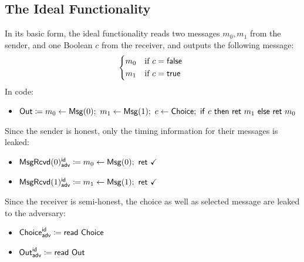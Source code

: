 \subsection{The Ideal Functionality}
In its basic form, the ideal functionality reads two messages $m_0,m_1$ from the sender, and one Boolean $c$ from the receiver, and outputs the following message:
\[\begin{cases*}
m_0 & \text{if $c = \false$} \\
m_1 & \text{if $c = \true$}
\end{cases*}\]
In code:
\begin{itemize}
\item $\Out \coloneqq m_0 \leftarrow \Msg(0); \ m_1 \leftarrow \Msg(1); \ c \leftarrow \Choice; \ \ifte{c}{\ret{m_1}}{\ret{m_0}}$
\end{itemize}
Since the sender is honest, only the timing information for their messages is leaked:
\begin{itemize}
\item {\color{blue} $\LeakMsgRcvd(0)^\id_\adv \coloneqq m_0 \leftarrow \Msg(0); \ \ret{\checkmark}$}
\item {\color{blue} $\LeakMsgRcvd(1)^\id_\adv \coloneqq m_1 \leftarrow \Msg(1); \ \ret{\checkmark}$}
\end{itemize}
Since the receiver is semi-honest, the choice as well as selected message are leaked to the adversary:
\begin{itemize}
\item {\color{blue} $\mathsf{Choice}^{\mathsf{id}}_{\mathsf{adv}} \coloneqq \mathsf{read} \ \mathsf{Choice}$}
\item {\color{blue} $\mathsf{Out}^{\mathsf{id}}_{\mathsf{adv}} \coloneqq \mathsf{read} \ \mathsf{Out}$}
\end{itemize}

